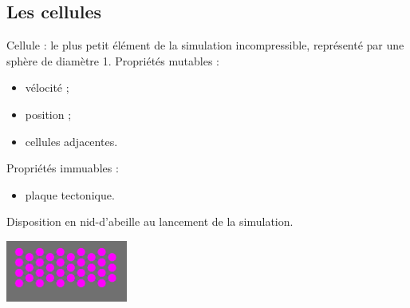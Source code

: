\documentclass{beamer}
\begin{document}
\subsection{Les cellules}
\begin{frame}
  Cellule : le plus petit élément de la simulation incompressible, représenté par une sphère de diamètre 1. \smallbreak
  Propriétés mutables :
  \begin{itemize}
   \item vélocité ;
   \item position ;
   \item cellules adjacentes.
  \end{itemize}
  Propriétés immuables :
  \begin{itemize}
   \item plaque tectonique.
  \end{itemize}
  Disposition en nid-d'abeille au lancement de la simulation.
  \begin{center}
    \includegraphics[width=4cm]{Images/hexagone.png}
  \end{center}
\end{frame}
\end{document}
